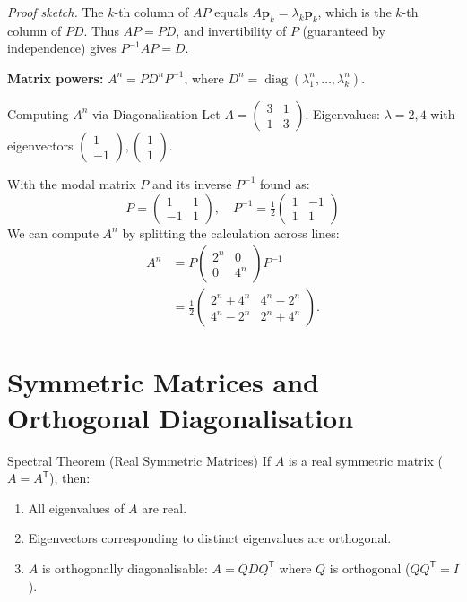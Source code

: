 \documentclass[12pt, a4paper]{book}
\newenvironment{keyresult}{%
  \begin{tcolorbox}[keystyle]%
}{%
  \end{tcolorbox}%
}
\newcommand{\trans}{^{\mathsf{T}}}
\newcommand{\inv}{^{-1}}
\renewcommand{\vec}[1]{\mathbf{#1}}
\begin{document}
\textit{Proof sketch.} The $k$-th column of $AP$ equals $A\vec{p}_k=\lambda_k\vec{p}_k$, which is the $k$-th column of $PD$. Thus $AP=PD$, and invertibility of $P$ (guaranteed by independence) gives $P\inv AP=D$.

\begin{keyresult}
\textbf{Matrix powers:} $A^n = PD^n P\inv$, where $D^n=\operatorname{diag}(\lambda_1^n,\ldots,\lambda_k^n)$.
\end{keyresult}

\begin{example}{Computing $A^n$ via Diagonalisation}{}
Let $A=\begin{pmatrix}3&1\\1&3\end{pmatrix}$. Eigenvalues: $\lambda=2,4$ with eigenvectors $\begin{pmatrix}1\\-1\end{pmatrix},\begin{pmatrix}1\\1\end{pmatrix}$.

\medskip

With the modal matrix $P$ and its inverse $P^{-1}$ found as:
\[
P=\begin{pmatrix}1&1\\-1&1\end{pmatrix}, \quad P^{-1}=\tfrac{1}{2}\begin{pmatrix}1&-1\\1&1\end{pmatrix}
\]
We can compute $A^n$ by splitting the calculation across lines:
\begin{align*}
A^n &= P\begin{pmatrix}2^n&0\\0&4^n\end{pmatrix}P^{-1} \\
&= \tfrac{1}{2}\begin{pmatrix}2^n+4^n & 4^n-2^n \\ 4^n-2^n & 2^n+4^n\end{pmatrix}.
\end{align*}
\end{example}

\section{Symmetric Matrices and Orthogonal Diagonalisation}

\begin{theorem}{Spectral Theorem (Real Symmetric Matrices)}{}
If $A$ is a real symmetric matrix ($A=A\trans$), then:
\begin{enumerate}[label=(\roman*)]
  \item All eigenvalues of $A$ are real.
  \item Eigenvectors corresponding to distinct eigenvalues are orthogonal.
  \item $A$ is orthogonally diagonalisable: $A=QDQ\trans$ where $Q$ is orthogonal ($QQ\trans=I$).
\end{enumerate}
\end{theorem}
\end{document}
